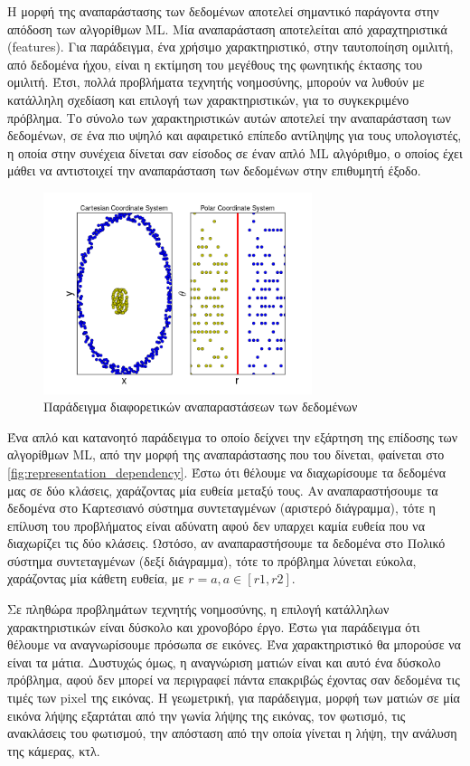 Η μορφή της αναπαράστασης των δεδομένων αποτελεί σημαντικό παράγοντα στην
απόδοση των αλγορίθμων ML. Μία αναπαράσταση αποτελείται από χαραχτηριστικά (features).
Για παράδειγμα, ένα χρήσιμο χαρακτηριστικό, στην ταυτοποίηση ομιλιτή, από δεδομένα ήχου,
είναι η εκτίμηση του μεγέθους της φωνητικής έκτασης του ομιλιτή.
Έτσι, πολλά προβλήματα τεχνητής νοημοσύνης, μπορούν να λυθούν
με κατάλληλη σχεδίαση και επιλογή των χαρακτηριστικών, για το συγκεκριμένο
πρόβλημα. Το σύνολο των χαρακτηριστικών αυτών αποτελεί την αναπαράσταση των δεδομένων,
σε ένα πιο υψηλό και αφαιρετικό επίπεδο αντίληψης για τους υπολογιστές, η οποία
στην συνέχεια δίνεται σαν είσοδος σε έναν απλό ML αλγόριθμο, ο οποίος έχει
μάθει να αντιστοιχεί την αναπαράσταση των δεδομένων στην επιθυμητή έξοδο.
\begin{figure}[!h]
  \centering
  \includegraphics[width=0.7\textwidth]{./images/chapter3/representation_dependency.png}
  \caption[Παράδειγμα διαφορετικών αναπαραστάσεων των δεδομένων]{Παράδειγμα διαφορετικών αναπαραστάσεων των δεδομένων}
  \label{fig:representation_dependency}
\end{figure}

Ένα απλό και κατανοητό παράδειγμα το οποίο δείχνει την εξάρτηση της επίδοσης των
αλγορίθμων ML, από την μορφή της αναπαράστασης που του δίνεται, φαίνεται στο
\autoref{fig:representation_dependency}. Έστω ότι θέλουμε να
διαχωρίσουμε τα δεδομένα μας σε δύο κλάσεις, χαράζοντας μία ευθεία
μεταξύ τους. Αν αναπαραστήσουμε τα δεδομένα στο Καρτεσιανό σύστημα συντεταγμένων (αριστερό διάγραμμα),
τότε η επίλυση του προβλήματος είναι αδύνατη αφού δεν υπαρχει καμία ευθεία
που να διαχωρίζει τις δύο κλάσεις. Ωστόσο, αν αναπαραστήσουμε τα δεδομένα
στο Πολικό σύστημα συντεταγμένων (δεξί διάγραμμα), τότε το πρόβλημα λύνεται
εύκολα, χαράζοντας μία κάθετη ευθεία, με $r  = a, a \in [r1, r2]$.

Σε πληθώρα προβλημάτων τεχνητής νοημοσύνης, η επιλογή κατάλληλων χαρακτηριστικών
είναι δύσκολο και χρονοβόρο έργο. Έστω για παράδειγμα ότι θέλουμε να αναγνωρίσουμε
πρόσωπα σε εικόνες. Ένα χαρακτηριστικό θα μπορούσε να είναι τα μάτια. Δυστυχώς όμως,
η αναγνώριση ματιών είναι και αυτό ένα δύσκολο πρόβλημα, αφού δεν μπορεί να
περιγραφεί πάντα επακριβώς έχοντας σαν δεδομένα τις τιμές των pixel της εικόνας.
Η γεωμετρική, για παράδειγμα, μορφή των ματιών σε μία εικόνα λήψης εξαρτάται από την
γωνία λήψης της εικόνας, τον φωτισμό, τις ανακλάσεις του φωτισμού,
την απόσταση από την οποία γίνεται η λήψη, την ανάλυση της κάμερας, κτλ.


